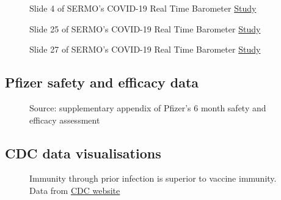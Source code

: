 \documentclass[11pt,a4paper,notitlepage]{report}
\begin{document}
\begin{figure}[h]
    \centering
    \caption{Slide 4 of SERMO's COVID-19 Real Time Barometer \href{https://public-cdn.sermo.com/covid19/c8/be4e/4edbd4/dbd4ba4ac5a3b3d9a479f99cc5/wave-i-sermo-covid-19-global-analysis-final.pdf}{Study} \cite{sermo25032020}}
    \label{fig:SERMO-04}
\end{figure}

\begin{figure}[h]
    \centering
    \caption{Slide 25 of SERMO's COVID-19 Real Time Barometer \href{https://public-cdn.sermo.com/covid19/c8/be4e/4edbd4/dbd4ba4ac5a3b3d9a479f99cc5/wave-i-sermo-covid-19-global-analysis-final.pdf}{Study} \cite{sermo25032020}}
    \label{fig:SERMO-25}
\end{figure}

\begin{figure}[h]
    \centering
    \caption{Slide 27 of SERMO's COVID-19 Real Time Barometer \href{https://public-cdn.sermo.com/covid19/c8/be4e/4edbd4/dbd4ba4ac5a3b3d9a479f99cc5/wave-i-sermo-covid-19-global-analysis-final.pdf}{Study} \cite{sermo25032020}}
    \label{fig:SERMO-27}
\end{figure}



\clearpage

\subsection*{Pfizer safety and efficacy data}

\begin{figure}[h]
    \centering
    \caption{Source: supplementary appendix \cite{doi:10.1056/NEJMoa2110345-appendix} of Pfizer's 6 month safety and efficacy assessment \cite{doi:10.1056/NEJMoa2110345}}
    \label{fig:Pfizer-6-month-appendix}
\end{figure}

\clearpage

\subsection*{CDC data visualisations}

\begin{figure}[h]
    \centering
    \caption{Immunity through prior infection is superior to vaccine immunity. Data from \href{https://www.cdc.gov/mmwr/volumes/71/wr/mm7104e1.htm}{CDC website} \cite{cdc28012020}}
    \label{fig:CDC-natural-immunity}
\end{figure}
\end{document}

